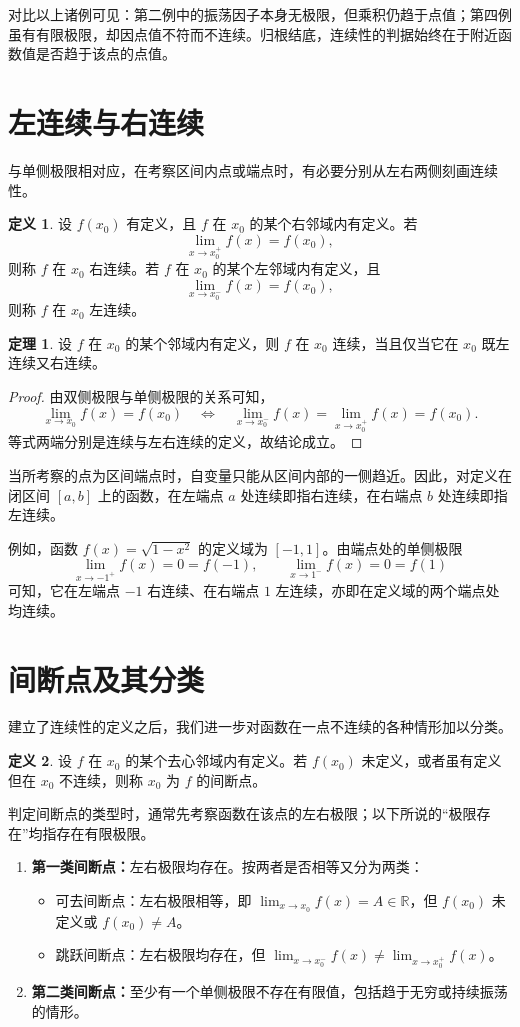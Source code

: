 \documentclass[UTF8,fontset=fandol,a4paper,12pt]{ctexart}
\newcommand{\R}{\mathbb R}
\theoremstyle{definition}
\newtheorem*{definition}{定义}
\newtheorem*{theorem}{定理}
\begin{document}
对比以上诸例可见：第二例中的振荡因子本身无极限，但乘积仍趋于点值；第四例虽有有限极限，却因点值不符而不连续。归根结底，连续性的判据始终在于附近函数值是否趋于该点的点值。

\section{左连续与右连续}
与单侧极限相对应，在考察区间内点或端点时，有必要分别从左右两侧刻画连续性。

\begin{definition}
设 $f(x_0)$ 有定义，且 $f$ 在 $x_0$ 的某个右邻域内有定义。若
\[
 \lim_{x\to x_0^+}f(x)=f(x_0),
\]
则称 $f$ 在 $x_0$ 右连续。若 $f$ 在 $x_0$ 的某个左邻域内有定义，且
\[
 \lim_{x\to x_0^-}f(x)=f(x_0),
\]
则称 $f$ 在 $x_0$ 左连续。
\end{definition}

\begin{theorem}
设 $f$ 在 $x_0$ 的某个邻域内有定义，则 $f$ 在 $x_0$ 连续，当且仅当它在 $x_0$ 既左连续又右连续。
\end{theorem}
\begin{proof}
由双侧极限与单侧极限的关系可知，
\[
 \lim_{x\to x_0}f(x)=f(x_0)
 \quad\Longleftrightarrow\quad
 \lim_{x\to x_0^-}f(x)=\lim_{x\to x_0^+}f(x)=f(x_0).
\]
等式两端分别是连续与左右连续的定义，故结论成立。
\end{proof}

当所考察的点为区间端点时，自变量只能从区间内部的一侧趋近。因此，对定义在闭区间 $[a,b]$ 上的函数，在左端点 $a$ 处连续即指右连续，在右端点 $b$ 处连续即指左连续。

例如，函数 $f(x)=\sqrt{1-x^2}$ 的定义域为 $[-1,1]$。由端点处的单侧极限
\[
 \lim_{x\to-1^+}f(x)=0=f(-1),\qquad
 \lim_{x\to1^-}f(x)=0=f(1)
\]
可知，它在左端点 $-1$ 右连续、在右端点 $1$ 左连续，亦即在定义域的两个端点处均连续。

\section{间断点及其分类}
建立了连续性的定义之后，我们进一步对函数在一点不连续的各种情形加以分类。

\begin{definition}
设 $f$ 在 $x_0$ 的某个去心邻域内有定义。若 $f(x_0)$ 未定义，或者虽有定义但在 $x_0$ 不连续，则称 $x_0$ 为 $f$ 的间断点。
\end{definition}

判定间断点的类型时，通常先考察函数在该点的左右极限；以下所说的“极限存在”均指存在有限极限。
\begin{enumerate}
\item \textbf{第一类间断点：}左右极限均存在。按两者是否相等又分为两类：
\begin{itemize}
\item 可去间断点：左右极限相等，即 $\lim_{x\to x_0}f(x)=A\in\R$，但 $f(x_0)$ 未定义或 $f(x_0)\ne A$。
\item 跳跃间断点：左右极限均存在，但 $\lim_{x\to x_0^-}f(x)\ne\lim_{x\to x_0^+}f(x)$。
\end{itemize}
\item \textbf{第二类间断点：}至少有一个单侧极限不存在有限值，包括趋于无穷或持续振荡的情形。
\end{enumerate}
\end{document}
